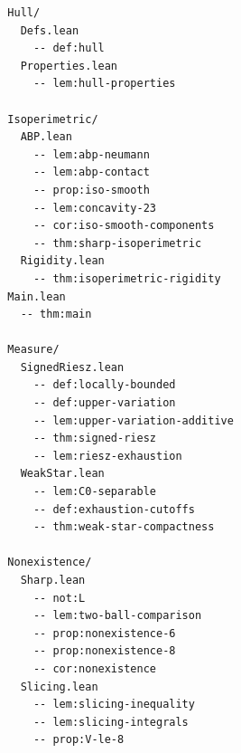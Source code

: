 {\begin{verbatim}
  Hull/
    Defs.lean
      -- def:hull
    Properties.lean
      -- lem:hull-properties

  Isoperimetric/
    ABP.lean
      -- lem:abp-neumann
      -- lem:abp-contact
      -- prop:iso-smooth
      -- lem:concavity-23
      -- cor:iso-smooth-components
      -- thm:sharp-isoperimetric
    Rigidity.lean
      -- thm:isoperimetric-rigidity
  Main.lean
    -- thm:main

  Measure/
    SignedRiesz.lean
      -- def:locally-bounded
      -- def:upper-variation
      -- lem:upper-variation-additive
      -- thm:signed-riesz
      -- lem:riesz-exhaustion
    WeakStar.lean
      -- lem:C0-separable
      -- def:exhaustion-cutoffs
      -- thm:weak-star-compactness

  Nonexistence/
    Sharp.lean
      -- not:L
      -- lem:two-ball-comparison
      -- prop:nonexistence-6
      -- prop:nonexistence-8
      -- cor:nonexistence
    Slicing.lean
      -- lem:slicing-inequality
      -- lem:slicing-integrals
      -- prop:V-le-8


\end{verbatim}}
